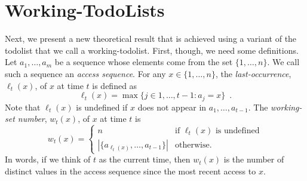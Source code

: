 \documentclass[lotsofwhite]{patmorin}
\begin{document}
%
%

\section{Working-TodoLists}

Next, we present a new theoretical result that is achieved using a
variant of the todolist that we call a working-todolist.  First, though, we need
some definitions.  Let $a_1,\ldots,a_m$ be a sequence whose elements come
from the set $\{1,\ldots,n\}$.  We call such a sequence an \emph{access
sequence}. For any $x\in\{1,\ldots,n\}$, the \emph{last-occurrence},
$\ell_t(x)$, of $x$ at time $t$ is defined as
\[
   \ell_t(x)=\max\{j\in{1,\ldots,t-1}: a_{j} = x\} \enspace .
\]
Note that $\ell_t(x)$ is undefined if $x$ does not appear in
$a_1,\ldots,a_{t-1}$.  The \emph{working-set number}, $w_t(x)$, of $x$
at time $t$ is
\[
    w_t(x) = \begin{cases}
               n & \text{if $\ell_t(x)$ is undefined} \\
               |\{a_{\ell_t(x)},\ldots,a_{t-1}\}| & \text{otherwise.}
             \end{cases}
\]
In words, if we think of $t$ as the current time, then $w_t(x)$ is the
number of distinct values in the access sequence since the most recent
access to $x$.
\end{document}

